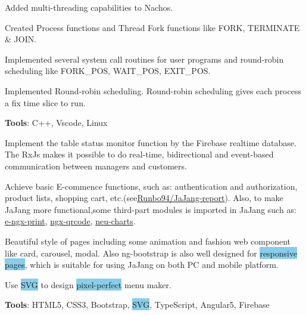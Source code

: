 \documentclass[letterpaper]{deedy-resume} %
\begin{document}
\begin{minipage}[t]{0.33\textwidth} %


\end{minipage} %
\begin{minipage}[t]{1\textwidth} %
\begin{tightitemize}
	\item Added multi-threading capabilities to Nachos.
	\item Created Process functions and Thread Fork functions like FORK, TERMINATE \& JOIN.
	\item Implemented several system call routines for user programs and round-robin scheduling like FORK\_POS, WAIT\_POS, EXIT\_POS.
	\item Implemented Round-robin scheduling. Round-robin scheduling gives each process a fix time slice to run.
	\item \textbf{Tools}: C++, Vscode, Linux
\end{tightitemize}

\sectionspace %
\vspace{\topsep} %
\begin{tightitemize}
	\item Implement the table status monitor function by the Firebase realtime database. The RxJs makes it possible to do real-time, bidirectional and event-based communication between managers and customers.
	\item Achieve basic E-commence functions, such as: authentication and authorization, product lists, shopping cart, etc.(see\href{https://github.com/Runbo94/JaJang-report}{Runbo94/JaJang-report}). Also, to make JaJang more functional,some third-part modules is imported in JaJang such as: \href{https://github.com/laixiangran/e-ngx-print}{e-ngx-print}, \href{https://github.com/nacardin/ngx-qrcode}{ngx-qrcode},
	\href{https://www.npmjs.com/package/neu-charts}{neu-charts}.
	\item  Beautiful style of pages including some animation and fashion web component like card, carousel, modal. Also ng-bootstrap is also well designed for \colorbox{SkyBlue}{responsive pages}, which is suitable for using JaJang on both PC and mobile platform.
	\item Use \colorbox{SkyBlue}{SVG} to design \colorbox{SkyBlue}{pixel-perfect} menu maker.
	\item \textbf{Tools}: HTML5, CSS3, Bootstrap, \colorbox{SkyBlue}{SVG}, TypeScript, Angular5, Firebase
\end{tightitemize}
\sectionspace %


\end{minipage}
\end{document}
